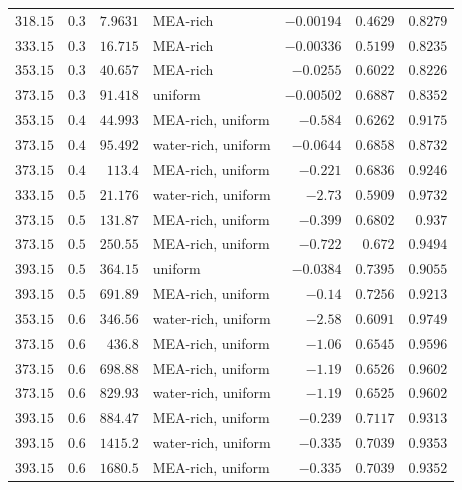 \begin{table}[!htbp]
\begin{tabular}{@{}rrrlrrr@{}}
$318.15$ & $0.3$ & $7.9631$ & MEA-rich & $-0.00194$ & $0.4629$ & $0.8279$ \\
$333.15$ & $0.3$ & $16.715$ & MEA-rich & $-0.00336$ & $0.5199$ & $0.8235$ \\
$353.15$ & $0.3$ & $40.657$ & MEA-rich & $-0.0255$ & $0.6022$ & $0.8226$ \\
$373.15$ & $0.3$ & $91.418$ & uniform & $-0.00502$ & $0.6887$ & $0.8352$ \\
$353.15$ & $0.4$ & $44.993$ & MEA-rich, uniform & $-0.584$ & $0.6262$ & $0.9175$ \\
$373.15$ & $0.4$ & $95.492$ & water-rich, uniform & $-0.0644$ & $0.6858$ & $0.8732$ \\
$373.15$ & $0.4$ & $113.4$ & MEA-rich, uniform & $-0.221$ & $0.6836$ & $0.9246$ \\
$333.15$ & $0.5$ & $21.176$ & water-rich, uniform & $-2.73$ & $0.5909$ & $0.9732$ \\
$373.15$ & $0.5$ & $131.87$ & MEA-rich, uniform & $-0.399$ & $0.6802$ & $0.937$ \\
$373.15$ & $0.5$ & $250.55$ & MEA-rich, uniform & $-0.722$ & $0.672$ & $0.9494$ \\
$393.15$ & $0.5$ & $364.15$ & uniform & $-0.0384$ & $0.7395$ & $0.9055$ \\
$393.15$ & $0.5$ & $691.89$ & MEA-rich, uniform & $-0.14$ & $0.7256$ & $0.9213$ \\
$353.15$ & $0.6$ & $346.56$ & water-rich, uniform & $-2.58$ & $0.6091$ & $0.9749$ \\
$373.15$ & $0.6$ & $436.8$ & MEA-rich, uniform & $-1.06$ & $0.6545$ & $0.9596$ \\
$373.15$ & $0.6$ & $698.88$ & MEA-rich, uniform & $-1.19$ & $0.6526$ & $0.9602$ \\
$373.15$ & $0.6$ & $829.93$ & water-rich, uniform & $-1.19$ & $0.6525$ & $0.9602$ \\
$393.15$ & $0.6$ & $884.47$ & MEA-rich, uniform & $-0.239$ & $0.7117$ & $0.9313$ \\
$393.15$ & $0.6$ & $1415.2$ & water-rich, uniform & $-0.335$ & $0.7039$ & $0.9353$ \\
$393.15$ & $0.6$ & $1680.5$ & MEA-rich, uniform & $-0.335$ & $0.7039$ & $0.9352$ \\
\bottomrule
\end{tabular}
\end{table}
